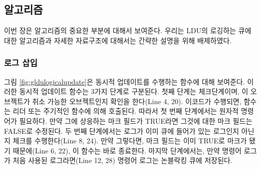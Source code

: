 \subsection{알고리즘}

이번 장은 알고리즘의 중요한 부분에 대해서 보여준다.
우리는 LDU의 로깅하는 큐에 대한 알고리즘과 자세한 자료구조에 대해서는 간략한 설명을 위해 
배제하였다. 

\subsubsection{로그 삽입}
그림 \ref{fig:gldulogicalupdate}은 동시적 업데이트를 수행하는 함수에 대해 보여준다.
이러한 동시적 업데이트 함수는 3가지 단계로 구분된다.
첫째 단계는 체크단계이며, 이 오브젝트가 취소 가능한 오브젝트인지 확인을 한다(Line 4, 20). 
이코드가 수행되면,  함수는 리더 또는 주기적인 함수에 의해 호출된다.
따라서 첫 번째 단계에서는 원자적 명령어가 필요하다.
만약 그에 상응하는 마크 필드가 TRUE라면 그것에 대한 마크 필드는 FALSE로 수정된다.
두 번째 단계에서는 로그가 이미 큐에 들어가 있는 로그인지 아닌지 체크를 수행한다(Line 8, 24).
만약 그렇다면, 마크 필드는 이미 TRUE로 마크가 됐기 때문에(Line 6, 22), 이 함수는 
바로 종료한다.
마지막 단계에서는, 만약 명령어 로그가 처음 사용된 로그라면(Line 12, 28)
 명령어 로그는 논블락킹 큐에 저장된다. 

